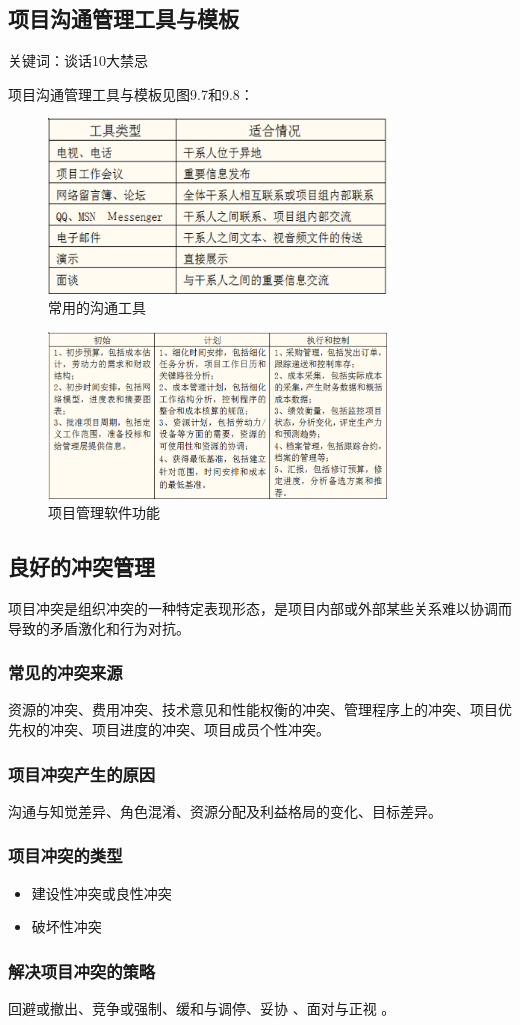 \subsection{项目沟通管理工具与模板}
\par 关键词：谈话10大禁忌
\par 项目沟通管理工具与模板见图9.7和9.8：
\begin{figure}[!h]
	\centering
	\includegraphics[width=0.8\textwidth]{image/9-7}
	\caption{常用的沟通工具}
\end{figure}
\begin{figure}[!h]
	\centering
	\includegraphics[width=0.8\textwidth]{image/9-8}
	\caption{项目管理软件功能}
\end{figure}
\subsection{良好的冲突管理}
项目冲突是组织冲突的一种特定表现形态，是项目内部或外部某些关系难以协调而导致的矛盾激化和行为对抗。
\subsubsection*{常见的冲突来源}
资源的冲突、费用冲突、技术意见和性能权衡的冲突、管理程序上的冲突、项目优先权的冲突、项目进度的冲突、项目成员个性冲突。
\subsubsection*{项目冲突产生的原因}
沟通与知觉差异、角色混淆、资源分配及利益格局的变化、目标差异。
\subsubsection*{项目冲突的类型}
\begin{itemize}
	\item 建设性冲突或良性冲突
	\item 破坏性冲突 
\end{itemize}
\subsubsection*{解决项目冲突的策略}
回避或撤出、竞争或强制、缓和与调停、妥协 、面对与正视 。